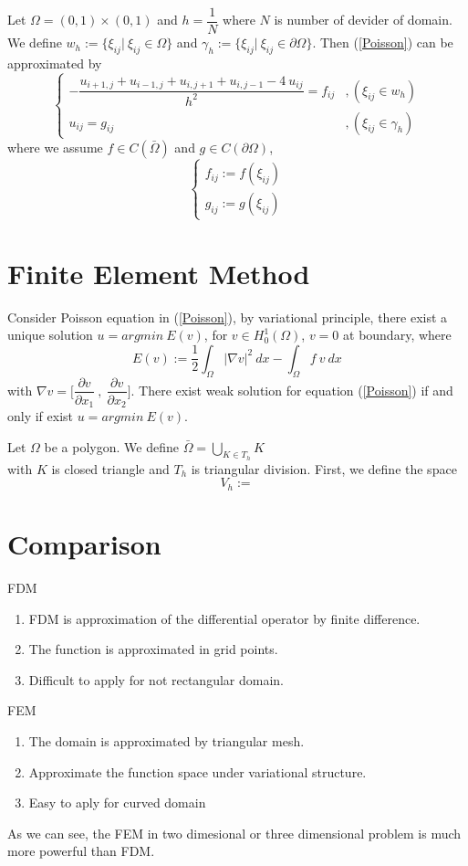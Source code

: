 \documentclass[]{report}
\begin{document}
Let $ \Omega = (0,1) \times (0,1) $ and $ h=\dfrac{1}{N} $ where $ N $ is number of devider of domain. We define $ w_{h} := \{ \xi_{ij} | \ \xi_{ij} \in \Omega \} $ and $ \gamma_{h} := \{ \xi_{ij} | \ \xi_{ij} \in \partial \Omega \} $. Then (\ref{Poisson}) can be approximated by
\begin{equation}\label{poisson_discrete}
\begin{cases}
- \dfrac{u_{i+1,j}+u_{i-1,j}+u_{i,j+1}+u_{i,j-1}-4 \ u_{ij}}{h^2} = f_{ij} &, (\xi_{ij}\in w_{h}) \\
u_{ij} = g_{ij} &,(\xi_{ij}\in\gamma_{h})
\end{cases}
\end{equation}
where we assume $ f \in C(\bar{\Omega}) $ and $ g \in C(\partial \Omega) $,
\[ \begin{cases}
f_{ij} := f(\xi_{ij}) \\ g_{ij} := g(\xi_{ij}) 
\end{cases} \]

\section{Finite Element Method}
Consider Poisson equation in (\ref{Poisson}), by variational principle, there exist a unique solution $ u = argmin \ E(v) $, for $ v \in H_{0}^{1}(\Omega) $, $ v=0 $ at boundary, where
\[ E(v) := \dfrac{1}{2} \int_{\Omega} |\nabla v|^2 \ dx - \int_{\Omega} f \ v \ dx \]
with $ \nabla v = \Big[ \dfrac{\partial v}{\partial x_{1}} \ , \ \dfrac{\partial v}{\partial x_{2}} \Big] $. There exist weak solution for equation (\ref{Poisson}) if and only if exist $ u = argmin \ E(v) $. 

Let $ \Omega $ be a polygon. We define $ \bar{\Omega} = \bigcup\limits_{K \in T_{h}} K $
\vspace{3cm}
\\ with $ K $ is closed triangle and $ T_{h} $ is triangular division. First, we define the space
\[ V_{h} :=  \]

\section{Comparison}

FDM
\begin{enumerate}
	\item FDM is approximation of the differential operator by finite difference.
	\item The function is approximated in grid points.
	\item Difficult to apply for not rectangular domain.
\end{enumerate}
FEM
\begin{enumerate}
	\item The domain is approximated by triangular mesh.
	\item Approximate the function space under variational structure.
	\item Easy to aply for curved domain
\end{enumerate}

As we can see, the FEM in two dimesional  or three dimensional problem is much more powerful than FDM.
\end{document}
